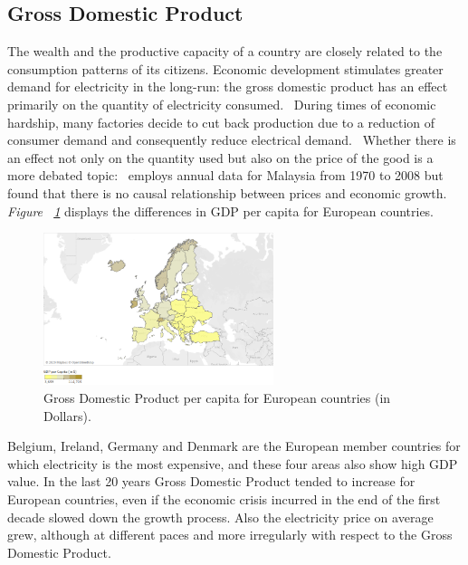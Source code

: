 \documentclass[a4paper,12pt]{book}
\begin{document}
\subsection{Gross Domestic Product}

The wealth and the productive capacity of a country are closely related to the consumption patterns of its citizens. Economic development stimulates greater demand for electricity in the long-run: the gross domestic product has an effect primarily on the quantity of electricity consumed.~\cite{jamil2010relationship} During times of economic hardship, many factories decide to cut back production due to a reduction of consumer demand and consequently reduce electrical demand.~\cite{g} Whether there is an effect not only on the quantity used but also on the price of the good is a more debated topic:~\cite{lean2010multivariate} employs annual data for Malaysia from 1970 to 2008 but found that there is no causal relationship between prices and economic growth. \textit{Figure ~\ref{fig:GDP}} displays the differences in GDP per capita for European countries.~\cite{GDP}

\begin{figure}[tb]
\begin{center}
\captionsetup{justification=centering}
\includegraphics[width=0.6\textwidth]{Images/gdp.png}
\caption{Gross Domestic Product per capita for European countries (in Dollars).}
\label{fig:GDP}
\end{center}
\end{figure}

Belgium, Ireland, Germany and Denmark are the European member countries for which electricity is the most expensive, and these four areas also show high GDP value. In the last 20 years Gross Domestic Product tended to increase for European countries, even if the economic crisis incurred in the end of the first decade slowed down the growth process. Also the electricity price on average grew, although at different paces and more irregularly with respect to the Gross Domestic Product.
\end{document}
